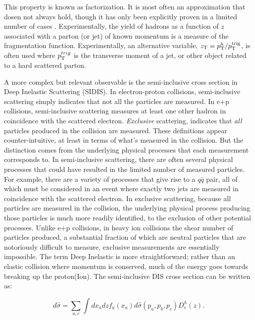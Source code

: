   This property is known as factorization. It is most often an approximation that dosen not always hold, though it has only been explicitly proven in a limited number of cases \cite{Collins2004}. Experimentally, the yield of hadrons as a function of $z$ associated with a parton (or jet) of known momentum is a measure of the fragmentation function. Experimentally, an alternative variable, $z_{\mathrm{T}}=p_{\mathrm{T}}^h/p_{\mathrm{T}}^\mathrm{trig}$, is often used where $p_{\mathrm{T}}^{trig}$ is the transverse moment of a jet, or other object related to a hard scattered parton. 

A more complex but relevant observable is the semi-inclusive cross section in Deep Inelastic Scattering (SIDIS). In electron-proton collisions, semi-inclusive scattering simply indicates that not all the particles are measured. In e+p collisions, semi-inclusive scattering measures at least one other hadron in coincidence with the scattered electron. \textit{Exclusive} scattering, indicates that \textit{all} particles produced in the collision are measured. These definitions appear counter-intuitive, at least in terms of what's measured in the collision. But the distinction comes from the underlying physical processes that each measurement corresponds to. In semi-inclusive scattering, there are often several physical processes that could have resulted in the limited number of measured particles. For example, there are a variety of processes that give rise to a $q\bar{q}$ pair, all of which must be considered in an event where exactly two jets are measured in coincidence with the scattered electron. In exclusive scattering, because all particles are measured in the collision, the underlying physical process producing those particles is much  more readily identified, to the exclusion of other potential processes. Unlike e+p collisions, in heavy ion collisions the shear number of particles produced, a substantial fraction of which are neutral particles that are notoriously difficult to measure, exclusive measurements are essentially impossible. The term Deep Inelastic is more straightforward; rather than an elastic collision where momentum is conserved, much of the energy goes towards breaking up the proton(Ion). The semi-inclusive DIS cross section can be written as:

  \begin{equation}
    d\hat{\sigma}= \sum_{a,c} \int dx_a dz f_a(x_a) d\hat{\sigma}(p_a,p_b,p_c) D_c^h(z).
    \label{sidis_cross_section}
  \end{equation}

